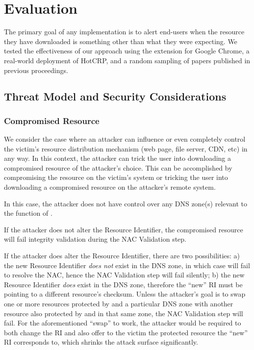 \section{Evaluation} \label{sec:evaluation}

The primary goal of any \SYSTEM{} implementation is to alert end-users when the
resource they have downloaded is something other than what they were expecting.
We tested the effectiveness of our approach using the \SYSTEM{} extension for
Google Chrome, a real-world deployment of HotCRP, and a random sampling of
papers published in previous \CONFERENCE{} proceedings.

\subsection{Threat Model and Security Considerations}

\subsubsection{Compromised Resource}

We consider the case where an attacker can influence or even completely control
the victim's resource distribution mechanism (web page, file server, CDN, etc)
in any way. In this context, the attacker can trick the user into downloading a
compromised resource of the attacker's choice. This can be accomplished by
compromising the resource on the victim's system or tricking the user into
downloading a compromised resource on the attacker's remote system.

In this case, the attacker does not have control over any DNS zone(s) relevant
to the function of \SYSTEM{}.

If the attacker does not alter the Resource Identifier, the compromised
resource will fail integrity validation during the NAC Validation step.

If the attacker does alter the Resource Identifier, there are two
possibilities: a) the new Resource Identifier \textit{does not} exist in the DNS
zone, in which case \SYSTEM{} will fail to resolve the NAC, hence the NAC
Validation step will fail silently; b) the new Resource Identifier \textit{does}
exist in the DNS zone, therefore the ``new'' RI must be pointing to a different
resource's checksum. Unless the attacker's goal is to swap one or more
resources protected by \SYSTEM{} and a particular DNS zone with another resource
also protected by \SYSTEM{} and in that same zone, the NAC Validation step will
fail. For the aforementioned ``swap'' to work, the attacker would be required
to both change the RI and also offer to the victim the \SYSTEM{} protected
resource the ``new'' RI corresponds to, which shrinks the attack surface
significantly.

